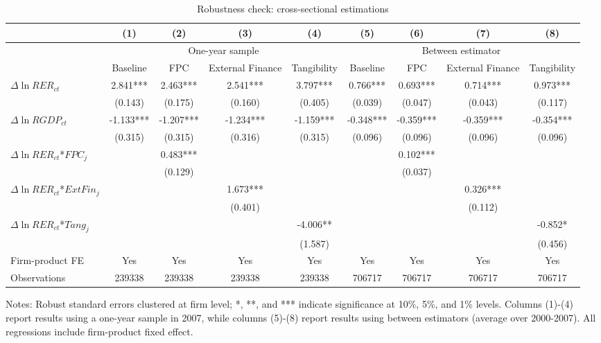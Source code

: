 \documentclass[12pt]{article}
\begin{document}
\begin{table}
	\centering
	\caption{Robustness check: cross-sectional estimations}
	\begin{threeparttable}
		\begin{tabular}{lcccccccc}
			\toprule
			& (1)   & (2)   & (3)   & (4) &  (5)  &  (6)  & (7)  & (8)\\
			\midrule
			& \multicolumn{4}{c}{One-year sample} & \multicolumn{4}{c}{Between estimator}\\
			& Baseline & FPC   & External Finance & Tangibility & Baseline & FPC & External Finance & Tangibility\\
			\midrule
			$\Delta \ln RER_{ct}$ & 2.841*** & 2.463*** & 2.541*** & 3.797*** & 0.766*** & 0.693*** & 0.714*** & 0.973*** \\
			& (0.143) & (0.175) & (0.160) & (0.405) & (0.039) & (0.047) & (0.043) & (0.117) \\
			$\Delta \ln RGDP_{ct}$ & -1.133*** & -1.207*** & -1.234*** & -1.159*** & -0.348*** & -0.359*** & -0.359*** & -0.354*** \\
			& (0.315) & (0.315) & (0.316) & (0.315) & (0.096) & (0.096) & (0.096) & (0.096) \\
			$\Delta \ln RER_{ct}$*$FPC_{j}$ &   & 0.483*** &       &       &       & 0.102*** &       &  \\
			&   & (0.129) &       &       &       & (0.037) &       &  \\
			$\Delta \ln RER_{ct}$*$ExtFin_{j}$ &   &       & 1.673*** &       &       &       & 0.326*** &  \\
			&  &       & (0.401) &       &       &       & (0.112) &  \\
			$\Delta \ln RER_{ct}$*$Tang_{j}$ &   &       &       & -4.006** &       &       &       & -0.852* \\
			&   &       &       & (1.587) &       &       &       & (0.456) \\
			Firm-product FE &  Yes   & Yes   & Yes   & Yes &Yes   & Yes   & Yes   & Yes\\
			Observations & 239338 & 239338 & 239338 & 239338 & 706717 & 706717 & 706717 & 706717 \\
			\bottomrule
		\end{tabular}
		\begin{tablenotes}
			\footnotesize
			\item[Notes:] Robust standard errors clustered at firm level; *, **, and *** indicate significance at 10\%, 5\%, and 1\% levels. Columns (1)-(4) report results using a one-year sample in 2007, while columns (5)-(8) report results using between estimators (average over 2000-2007). All regressions include firm-product fixed effect.
		\end{tablenotes}
	\end{threeparttable}
	\label{tab.robust.crosec}
\end{table}
\end{document}

